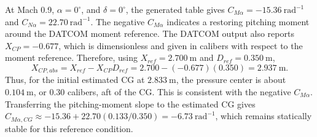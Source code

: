 At Mach 0.9, \(\alpha=0^\circ\), and \(\delta=0^\circ\), the generated table gives \(C_{M\alpha}=-15.36~\text{rad}^{-1}\) and \(C_{N\alpha}=22.70~\text{rad}^{-1}\). The negative \(C_{M\alpha}\) indicates a restoring pitching moment around the DATCOM moment reference. The DATCOM output also reports \(X_{CP}=-0.677\), which is dimensionless and given in calibers with respect to the moment reference. Therefore, using \(X_{ref}=2.700~\text{m}\) and \(D_{ref}=0.350~\text{m}\),
\[
    X_{CP,abs}=X_{ref}-X_{CP}D_{ref}
    =2.700-(-0.677)(0.350)
    =2.937~\text{m}.
\]
Thus, for the initial estimated CG at \(2.833~\text{m}\), the pressure center is about \(0.104~\text{m}\), or \(0.30\) calibers, aft of the CG. This is consistent with the negative \(C_{M\alpha}\). Transferring the pitching-moment slope to the estimated CG gives \(C_{M\alpha,CG}\approx -15.36+22.70(0.133/0.350)=-6.73~\text{rad}^{-1}\), which remains statically stable for this reference condition.
